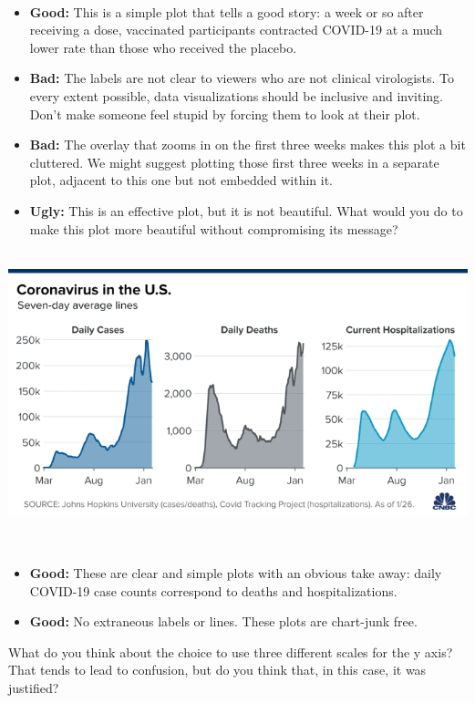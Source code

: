 \documentclass[]{book}
\begin{document}
~

\begin{itemize}
\item
  \textbf{Good:} This is a simple plot that tells a good story: a week or so after receiving a dose, vaccinated participants contracted COVID-19 at a much lower rate than those who received the placebo.
\item
  \textbf{Bad:} The labels are not clear to viewers who are not clinical virologists. To every extent possible, data visualizations should be inclusive and inviting. Don't make someone feel stupid by forcing them to look at their plot.
\item
  \textbf{Bad:} The overlay that zooms in on the first three weeks makes this plot a bit cluttered. We might suggest plotting those first three weeks in a separate plot, adjacent to this one but not embedded within it.
\item
  \textbf{Ugly:} This is an effective plot, but it is not beautiful. What would you do to make this plot more beautiful without compromising its message?
\end{itemize}

~\\

\includegraphics{img/vise.png}

~

\begin{itemize}
\item
  \textbf{Good:} These are clear and simple plots with an obvious take away: daily COVID-19 case counts correspond to deaths and hospitalizations.
\item
  \textbf{Good:} No extraneous labels or lines. These plots are chart-junk free.
\end{itemize}

What do you think about the choice to use three different scales for the y axis? That tends to lead to confusion, but do you think that, in this case, it was justified?
\end{document}
